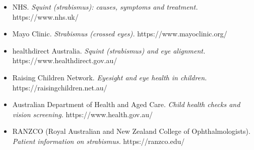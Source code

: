 \begin{itemize}
    \item NHS. \textit{Squint (strabismus): causes, symptoms and treatment.} https://www.nhs.uk/
    \item Mayo Clinic. \textit{Strabismus (crossed eyes).} https://www.mayoclinic.org/
    \item healthdirect Australia. \textit{Squint (strabismus) and eye alignment.} https://www.healthdirect.gov.au/
    \item Raising Children Network. \textit{Eyesight and eye health in children.} https://raisingchildren.net.au/
    \item Australian Department of Health and Aged Care. \textit{Child health checks and vision screening.} https://www.health.gov.au/
    \item RANZCO (Royal Australian and New Zealand College of Ophthalmologists). \textit{Patient information on strabismus.} https://ranzco.edu/
\end{itemize}

\clearpage
